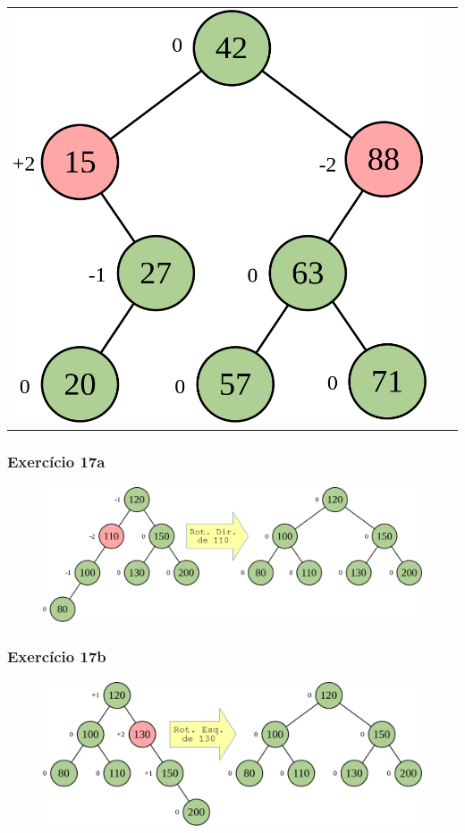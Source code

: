 \documentclass[aspectratio=169]{beamer}
\begin{document}
\begin{frame}[fragile]
\begin{tabular}{lll}
\includegraphics[height=0.4\paperheight]{imagens/avl10c.png} \\
\end{tabular}
\end{frame}

\begin{frame}[fragile]\frametitle{Exercício 17a}
\begin{figure}[h]
	\centering
	\includegraphics[height=0.40\paperheight]{imagens/avl13-rotdir110.png}
\end{figure}
\end{frame}

\begin{frame}[fragile]\frametitle{Exercício 17b}
\begin{figure}[h]
	\centering
	\includegraphics[height=0.40\paperheight]{imagens/avl14-rotesq130.png}
\end{figure}
\end{frame}
\end{document}
